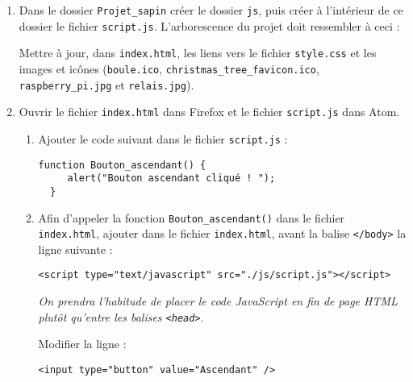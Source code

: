 \documentclass[a4paper]{article}
\begin{document}
\bigskip

\activite
\begin{enumerate}
  \item Dans le dossier \verb|Projet_sapin| créer le dossier \verb|js|, puis créer à l'intérieur de ce dossier le fichier \verb|script.js|. L'arborescence du projet doit ressembler à ceci :

    \begin{center}
    \end{center}
    Mettre à jour, dans \verb|index.html|, les liens vers le fichier \verb|style.css| et les images et icônes (\verb|boule.ico|, \verb|christmas_tree_favicon.ico|, \verb|raspberry_pi.jpg| et \verb|relais.jpg|).
  \item Ouvrir le fichier \verb|index.html| dans Firefox et le fichier \verb|script.js| dans Atom.
    \begin{enumerate}
      \item Ajouter le code suivant dans le fichier \verb|script.js| :

    \begin{verbatim}
function Bouton_ascendant() {
     alert("Bouton ascendant cliqué ! ");
  }
	\end{verbatim}

      \item Afin d'appeler la fonction \texttt{Bouton_ascendant()} dans le fichier \verb|index.html|, ajouter dans le fichier \verb|index.html|, avant la balise \texttt{</body>} la ligne suivante :

	\begin{verbatim}
<script type="text/javascript" src="./js/script.js"></script>
	\end{verbatim}

	\textit{On prendra l'habitude de placer le code JavaScript en fin de page HTML plutôt qu'entre les balises \texttt{<head>}}.

	\medskip

	Modifier la ligne :

	\begin{verbatim}
<input type="button" value="Ascendant" />
	\end{verbatim}


\end{enumerate}
\end{enumerate}
\end{document}
